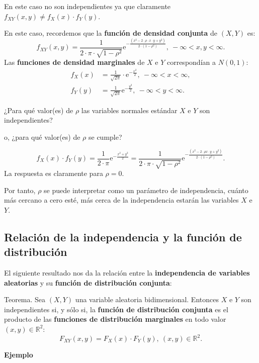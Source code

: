 \documentclass[]{book}
\begin{document}
En este caso no son independientes ya que claramente \(f_{XY}(x,y)\neq f_X(x)\cdot f_Y(y)\).

En este caso, recordemos que la \textbf{función de densidad conjunta} de \((X,Y)\) es:
\[
f_{XY}(x,y)=\frac{1}{2\cdot \pi\cdot \sqrt{1-\rho^2}}\mathrm{e}^{-\frac{(x^2-2\cdot \rho \cdot x\cdot y+y^2)}{2\cdot (1-\rho^2)}},\ -\infty <x,y<\infty.
\]
Las \textbf{funciones de densidad marginales} de \(X\) e \(Y\) correspondían a \(N(0,1)\):
\[
\begin{array}{rl}
f_X(x) & =\frac{1}{\sqrt{2\pi}}\cdot \mathrm{e}^{-\frac{x^2}{2}},\ -\infty <x<\infty,\\ f_Y(y) & =\frac{1}{\sqrt{2\pi}}\mathrm{e}^{-\frac{y^2}{2}},\ -\infty <y<\infty.
\end{array}
\]

¿Para qué valor(es) de \(\rho\) las variables normales estándar \(X\) e \(Y\) son independientes?

o, ¿para qué valor(es) de \(\rho\) se cumple?

\[
f_X(x)\cdot f_Y(y)=\frac{1}{2\cdot\pi}\mathrm{e}^{-\frac{x^2+y^2}{2}} = \frac{1}{2\cdot\pi\cdot\sqrt{1-\rho^2}}\mathrm{e}^{-\frac{(x^2-2\cdot\rho x \cdot y+y^2)}{2\cdot (1-\rho^2)}}.
\]
La respuesta es claramente para \(\rho=0\).

Por tanto, \(\rho\) se puede interpretar como un parámetro de independencia, cuánto más cercano a cero esté, más cerca de la independencia estarán las variables \(X\) e \(Y\).

\hypertarget{relaciuxf3n-de-la-independencia-y-la-funciuxf3n-de-distribuciuxf3n}{%
\subsection{Relación de la independencia y la función de distribución}\label{relaciuxf3n-de-la-independencia-y-la-funciuxf3n-de-distribuciuxf3n}}

El siguiente resultado nos da la relación entre la \textbf{independencia de variables aleatorias} y su \textbf{función de distribución conjunta}:

Teorema.
Sea \((X,Y)\) una variable aleatoria bidimensional. Entonces
\(X\) e \(Y\) son independientes si, y sólo si, la \textbf{función de distribución conjunta} es el producto de las \textbf{funciones de distribución marginales} en todo valor \((x,y)\in\mathbb{R}^2\):
\[
F_{XY}(x,y)=F_X(x)\cdot F_Y(y),\ (x,y)\in\mathbb{R}^2.
\]

\textbf{Ejemplo}
\end{document}
